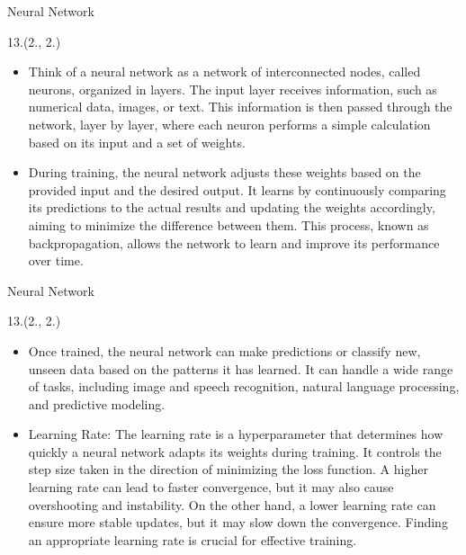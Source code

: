 \documentclass[12pt, xcolor={dvipsnames}, aspectratio = 169, sans,mathserif]{beamer}
\newenvironment{List}[2]
{\begin{textblock}{#1}#2
\begin{itemize}}
{\end{itemize}
\end{textblock}}
\begin{document}
\begin{frame}{Neural Network}

\begin{List}{13.}{(2., 2.)}

  \item Think of a neural network as a network of interconnected nodes, called neurons, organized in layers. The input
  layer receives information, such as numerical data, images, or text. This information is then passed through the network,
  layer by layer, where each neuron performs a simple calculation based on its input and a set of weights.

  \item During training, the neural network adjusts these weights based on the provided input and the desired output.
  It learns by continuously comparing its predictions to the actual results and updating the weights accordingly, aiming
  to minimize the difference between them. This process, known as backpropagation, allows the network to learn and improve
  its performance over time.

\end{List}

\end{frame}

\begin{frame}{Neural Network}

\begin{List}{13.}{(2., 2.)}

  \item Once trained, the neural network can make predictions or classify new, unseen data based on the patterns it has learned.
  It can handle a wide range of tasks, including image and speech recognition, natural language processing, and predictive modeling.

  \item Learning Rate: The learning rate is a hyperparameter that determines how quickly a neural network adapts its weights during
  training. It controls the step size taken in the direction of minimizing the loss function. A higher learning rate can lead
  to faster convergence, but it may also cause overshooting and instability. On the other hand, a lower learning rate can
  ensure more stable updates, but it may slow down the convergence. Finding an appropriate learning rate is crucial for
  effective training.

\end{List}

\end{frame}
\end{document}
